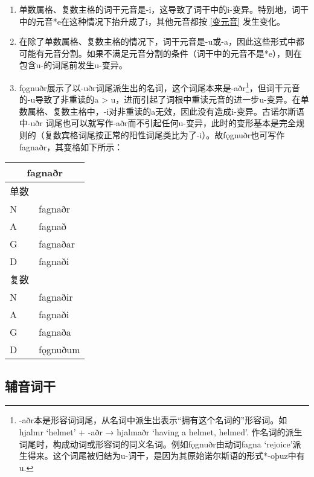   \begin{enumerate}[1)]
    \item
          单数属格、复数主格的词干元音是-i，这导致了词干中的i-变异。特别地，词干中的元音*e在这种情况下抬升成了i，其他元音都按 \ref{变元音} 发生变化。
    \item
          在除了单数属格、复数主格的情况下，词干元音是-u或-a，因此这些形式中都可能有元音分割。如果不满足元音分割的条件（词干中的元音不是*e），则在包含u-的词尾前发生u-变异。
    \item
          fǫgnuðr展示了以-uðr词尾派生出的名词，这个词尾本来是-aðr\footnote{-aðr本是形容词词尾，从名词中派生出表示``拥有这个名词的''形容词。如hjalmr
            `helmet' + -aðr → hjalmaðr `having a helmet, helmed'.
            作名词的派生词尾时，构成动词或形容词的同义名词。例如fǫgnuðr由动词fagna
            `rejoice'派生得来。这个词尾被归结为u-词干，是因为其原始诺尔斯语的形式*-oþuz中有u.}，但词干元音的-u导致了非重读的a
          \textgreater{}
          u，进而引起了词根中重读元音的进一步u-变异。在单数属格、复数主格中，-i对非重读的a无效，因此没有造成i-变异。古诺尔斯语中-uðr
          词尾也可以就写作-aðr而不引起任何u-变异，此时的变形基本是完全规则的（复数宾格词尾按正常的阳性词尾类比为了-i）。故fǫgnuðr也可写作fagnaðr，其变格如下所示：
  \end{enumerate}

  \begin{longtable}{ll}
    \toprule
    \multicolumn{2}{c}{\textbf{fagnaðr}} \\
    \midrule
    \endhead
    \bottomrule
    \endfoot
    单数 &                      \\
    N    & fagnaðr              \\
    A    & fagnað               \\
    G    & fagnaðar             \\
    D    & fagnaði              \\
    复数 &                      \\
    N    & fagnaðir             \\
    A    & fagnaði              \\
    G    & fagnaða              \\
    D    & fǫgnuðum             \\
  \end{longtable}

\subsection{辅音词干}
\label{辅音词干}

